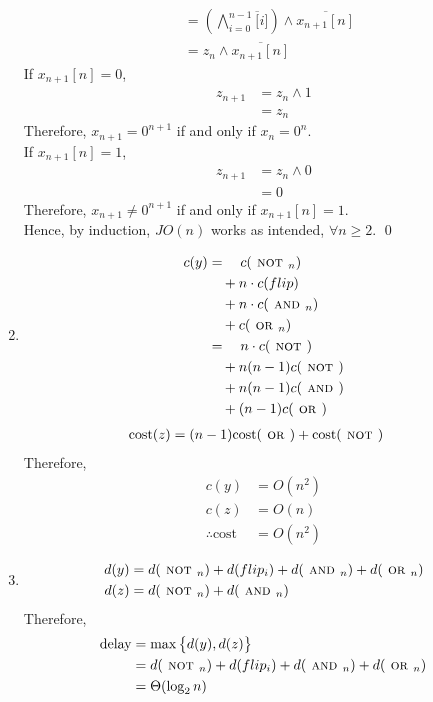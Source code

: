 \documentclass[fleqn, a4paper, 11pt, oneside]{amsart}
\theoremstyle{definition}
\theoremstyle{theorem}
\theoremstyle{remark}
\newcommand{\Not}{{\textsc{ not }}}
\renewcommand{\And}{{\textsc{ and }}}
\newcommand{\Or}{{\textsc{ or }}}
\newcommand{\AND}{\wedge}
\newcommand{\bigAND}{\bigwedge}
\begin{document}
\begin{solution}
\begin{enumerate}[leftmargin = *]
\begin{align*}
				&= \left( \bigAND_{i = 0}^{n - 1} \overline[i] \right) \AND \overline{x_{n + 1}[n]}\\
				&= z_n \AND \overline{x_{n + 1}[n]}
			\end{align*}
			If $x_{n + 1}[n] = 0$,
			\begin{align*}
				z_{n + 1} &= z_n \AND 1\\
				&= z_n
			\end{align*}
			Therefore, $x_{n + 1} = 0^{n + 1}$ if and only if $x_n = 0^n$.\\
			If $x_{n + 1}[n] = 1$,
			\begin{align*}
				z_{n + 1} &= z_n \AND 0\\
				&= 0
			\end{align*}
			Therefore, $x_{n + 1} \neq 0^{n + 1}$ if and only if $x_{n + 1}[n] = 1$.\\
			Hence, by induction, $JO(n)$ works as intended, $\forall n \ge 2$.
			\qed
		\item
			\begin{align*}
				c(y) &= \quad c(\Not_n)\\
				&\quad + n \cdot c(flip)\\
				&\quad + n \cdot c(\And_n)\\
				&\quad + c(\Or_n)\\
				&=\quad n \cdot c(\Not)\\
				&\quad + n (n - 1) c(\Not)\\
				&\quad + n (n - 1) c(\And)\\
				&\quad + (n - 1) c(\Or)
			\end{align*}
			\begin{align*}
				\text{cost}(z) &= (n - 1) \text{cost}(\Or) + \text{cost}(\Not)
			\end{align*}
			Therefore,
			\begin{align*}
				c(y) &= O\left( n^2 \right)\\
				c(z) &= O (n)\\
				\therefore \text{cost} &= O\left( n^2 \right)
			\end{align*}
		\item
			\begin{align*}
				d(y) &= d(\Not_n) + d(flip_i) + d(\And_n) + d(\Or_n)\\
				d(z) &= d(\Not_n) + d(\And_n)
			\end{align*}
			Therefore,
			\begin{align*}
				\text{delay} &= \max\left\{ d(y) , d(z) \right\}\\
				&= d(\Not_n) + d(flip_i) + d(\And_n) + d(\Or_n)\\
				&= \Theta(\log_2 n)
			\end{align*}
	\end{enumerate}
\end{solution}
\end{document}
